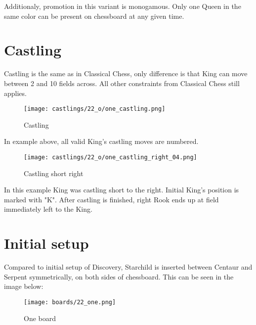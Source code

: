 Additionaly, promotion in this variant is monogamous.
Only one Queen in the same color can be present on chessboard at any given time.


\section*{Castling}

Castling is the same as in Classical Chess, only difference is that King can move between 2 and 10 fields across.
All other constraints from Classical Chess still applies.

\noindent
\begin{figure}[!h]
\texttt{[image: castlings/22\_o/one\_castling.png]}
\caption{Castling}
\label{fig:one_castling}
\end{figure}

In example above, all valid King's castling moves are numbered.

\noindent
\begin{figure}[!h]
\texttt{[image: castlings/22\_o/one\_castling\_right\_04.png]}
\caption{Castling short right}
\label{fig:one_castling_right_04}
\end{figure}

In this example King was castling short to the right. Initial King's position is marked with "K".
After castling is finished, right Rook ends up at field immediately left to the King.

\clearpage %

\section*{Initial setup}

Compared to initial setup of Discovery, Starchild is inserted between Centaur and Serpent
symmetrically, on both sides of chessboard. This can be seen in the image below:

\noindent
\begin{figure}[h]
\texttt{[image: boards/22\_one.png]}
\caption{One board}
\label{fig:22_one}
\end{figure}

\clearpage %
